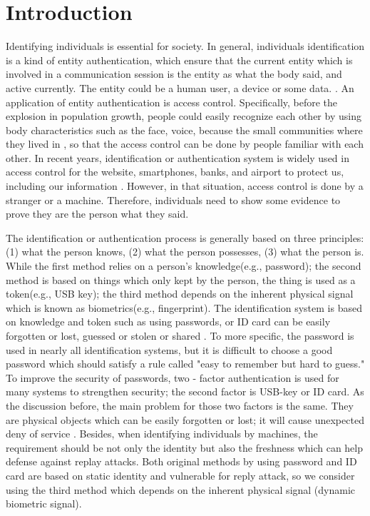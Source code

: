 \documentclass[a4paper,12pt]{article}
\begin{document}

\clearpage
\tableofcontents\label{c}

\clearpage
\section{Introduction}\label{Introduction}
Identifying individuals is essential for society. In general, individuals identification is a kind of entity authentication, which ensure that the current entity which is involved in a communication session is the entity as what the body said, and active currently. The entity could be a human user, a device or some data. \autocite{Martin:2012everyday}. An application of entity authentication is access control. Specifically, before the explosion in population growth, people could easily recognize each other by using body characteristics such as the face, voice, because the small communities where they lived in \autocite{Jain:2011bio}, so that the access control can be done by people familiar with each other. In recent years, identification or authentication system is widely used in access control for the website, smartphones, banks, and airport to protect us, including our information \autocite{Pinto:2018evolution}. However, in that situation, access control is done by a stranger or a machine. Therefore, individuals need to show some evidence to prove they are the person what they said.

The identification or authentication process is generally based on three principles: (1) what the person knows, (2) what the person possesses, (3) what the person is. While the first method relies on a person's knowledge(e.g., password); the second method is based on things which only kept by the person, the thing is used as a token(e.g., USB key); the third method depends on the inherent physical signal which is known as biometrics(e.g., fingerprint). The identification system is based on knowledge and token such as using passwords, or ID card can be easily forgotten or lost, guessed or stolen or shared \autocite{Jain:2011bio}. To more specific, the password is used in nearly all identification systems, but it is difficult to choose a good password which should satisfy a rule called "easy to remember but hard to guess." To improve the security of passwords, two - factor authentication is used for many systems to strengthen security; the second factor is USB-key or ID card. As the discussion before, the main problem for those two factors is the same. They are physical objects which can be easily forgotten or lost; it will cause unexpected deny of service \autocite{Blasco:2018feasibility}. Besides, when identifying individuals by machines, the requirement should be not only the identity but also the freshness which can help defense against replay attacks. Both original methods by using password and ID card are based on static identity and vulnerable for reply attack, so we consider using the third method which depends on the inherent physical signal (dynamic biometric signal).
\end{document}
